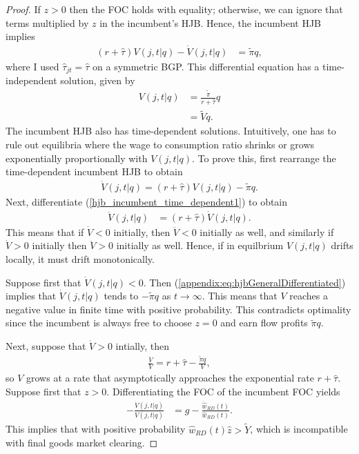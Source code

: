 \documentclass[11pt,english]{article}
\theoremstyle{definition}
\begin{document}
\begin{proof}
	If $z > 0$ then the FOC holds with equality; otherwise, we can ignore that terms multiplied by $z$ in the incumbent's HJB. Hence, the incumbent HJB implies
	\begin{align}
	(r + \hat{\tau}) V(j,t|q) - \dot{V}(j,t|q) &= \tilde{\pi} q, 
	\label{hjb_incumbent_time_dependent}
	\end{align}
	where I used $\hat{\tau}_{jt} = \hat{\tau}$ on a symmetric BGP. This differential equation has a time-independent solution, given by 
	\begin{align}
	V(j,t|q) &= \frac{\tilde{\pi} }{r + \hat{\tau}}  q\\
	&= \tilde{V} q.
	\end{align}
	The incumbent HJB also has time-dependent solutions. Intuitively, one has to rule out equilibria  where the wage to consumption ratio shrinks or grows exponentially proportionally with $V(j,t|q)$. To prove this, first rearrange the time-dependent incumbent HJB to obtain
	\begin{align}
		\dot{V}(j,t|q) = (r + \hat{\tau}) V(j,t|q) - \tilde{\pi} q. \label{hjb_incumbent_time_dependent1}
	\end{align} 
	Next, differentiate (\ref{hjb_incumbent_time_dependent1}) to obtain
	\begin{align}
		\ddot{V}(j,t|q) &= (r + \hat{\tau}) \dot{V}(j,t|q). \label{appendix:eq:hjbGeneralDifferentiated}
	\end{align}
	This means that if $\dot{V} < 0$ initially, then $\ddot{V} < 0$ initially as well, and similarly if $\dot{V} > 0$ initially then $\ddot{V} > 0$ initially as well. Hence, if in equilbrium $V(j,t|q)$ drifts locally, it must drift monotonically. 
	
	Suppose first that $\dot{V}(j,t|q) < 0$. Then (\ref{appendix:eq:hjbGeneralDifferentiated}) implies that $\dot{V}(j,t|q)$ tends to $-\tilde{\pi}q$ as $t \to \infty$. This means that $V$ reaches a negative value in finite time with positive probability. This contradicts optimality since the incumbent is always free to choose $z = 0$ and earn flow profits $\tilde{\pi} q$.
	
	Next, suppose that $\dot{V} > 0$ intially, then 
	\begin{align}
		\frac{\dot{V}}{V} = r + \hat{\tau} - \frac{\tilde{\pi} q}{V},
	\end{align}
	so $V$ grows at a rate that asymptotically approaches the exponential rate $r + \hat{\tau}$. Suppose first that $z > 0$. Differentiating the FOC of the incumbent FOC yields
	\begin{align}
		-\frac{\dot{V}(j,t|q)}{V(j,t|q)} &= g - \frac{\dot{\hat{w}}_{RD}(t)}{\hat{w}_{RD}(t)}. \label{appendix:eq:freeEntryDifferentiatedImplication}
	\end{align}
	This implies that with positive probability $\hat{w}_{RD}(t) \hat{z} > \tilde{Y}$, which is incompatible with final goods market clearing. 
	

\end{proof}
\end{document}
